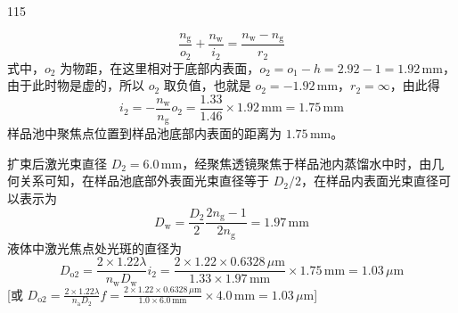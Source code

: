 \begin{solution}{115}
\begin{subsolution}
\begin{equation}
            \frac{n_{\mathrm{g}}}{o_{2}} + \frac{n_{\mathrm{w}}}{i_{2}} = \frac{n_{\mathrm{w}} - n_{\mathrm{g}}}{r_{2}}
            \label{eq:6.s115}
        \end{equation}
        式中，$o_{2}$ 为物距，在这里相对于底部内表面，$o_{2}=o_{1}-h=2.92-1=1.92 \,\mathrm{mm}$，由于此时物是虚的，所以 $o_{2}$ 取负值，也就是 $o_{2}=-1.92 \,\mathrm{mm}$，$r_{2}=\infty$，由此得
        \begin{equation}
            i_{2} = - \frac{n_{\mathrm{w}}}{n_{\mathrm{g}}} o_{2} = \frac{1.33}{1.46} \times 1.92 \,\mathrm{mm} = 1.75 \,\mathrm{mm}
            \label{eq:7.s115}
        \end{equation}
        样品池中聚焦点位置到样品池底部内表面的距离为 $1.75 \,\mathrm{mm}$。

        扩束后激光束直径 $D_{2}=6.0 \,\mathrm{mm}$，经聚焦透镜聚焦于样品池内蒸馏水中时，由几何关系可知，在样品池底部外表面光束直径等于 $D_{2}/2$，在样品内表面光束直径可以表示为
        \begin{equation}
            D_{\mathrm{w}} = \frac{D_{2}}{2} \frac{2 n_{\mathrm{g}} - 1}{2 n_{\mathrm{g}}} = 1.97 \,\mathrm{mm}
            \label{eq:8.s115}
        \end{equation}
        液体中激光焦点处光斑的直径为
        \begin{equation}
            D_{\mathrm{o2}} = \frac{2 \times 1.22 \lambda}{n_{\mathrm{w}} D_{\mathrm{w}}} i_{2} = \frac{2 \times 1.22 \times 0.6328 \,\mu\mathrm{m}}{1.33 \times 1.97 \,\mathrm{mm}} \times 1.75 \,\mathrm{mm} = 1.03 \,\mu\mathrm{m}
            \label{eq:9.s115}
        \end{equation}
        [或
        $D_{\mathrm{o2}} = \frac{2 \times 1.22 \lambda}{n_{\mathrm{a}} D_{2}} f = \frac{2 \times 1.22 \times 0.6328 \,\mu\mathrm{m}}{1.0 \times 6.0 \,\mathrm{mm}} \times 4.0 \,\mathrm{mm} = 1.03 \,\mu\mathrm{m}$]


\end{subsolution}
\end{solution}

